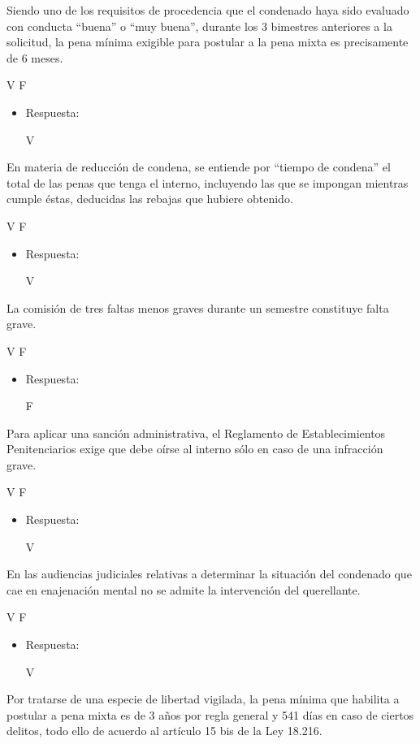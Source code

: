 \documentclass[letterpaper, 11pt]{article}
\begin{document}
Siendo uno de los requisitos de procedencia que el condenado haya sido
evaluado con conducta “buena” o “muy buena”, durante los 3 bimestres
anteriores a la solicitud, la pena mínima exigible para postular a la
pena mixta es precisamente de 6 meses.


V F


\begin{itemize}
\item Respuesta:

V
\end{itemize}

En materia de reducción de condena, se entiende por “tiempo de
condena” el total de las penas que tenga el interno, incluyendo las
que se impongan mientras cumple éstas, deducidas las rebajas que
hubiere obtenido.


V F

\begin{itemize}
\item Respuesta:

V
\end{itemize}

La comisión de tres faltas menos graves durante un semestre constituye
falta grave.

V F

\begin{itemize}
\item Respuesta:

F
\end{itemize}


Para aplicar una sanción administrativa, el Reglamento de
Establecimientos Penitenciarios exige que debe oírse al interno sólo
en caso de una infracción grave.

V F

\begin{itemize}
\item Respuesta:

V
\end{itemize}

En las audiencias judiciales relativas a determinar la situación del
condenado que cae en enajenación mental no se admite la intervención
del querellante.

V F

\begin{itemize}
\item Respuesta:

V
\end{itemize}

Por tratarse de una especie de libertad vigilada, la pena mínima que
habilita a postular a pena mixta es de 3 años por regla general y 541
días en caso de ciertos delitos, todo ello de acuerdo al artículo 15
bis de la Ley 18.216.
\end{document}
